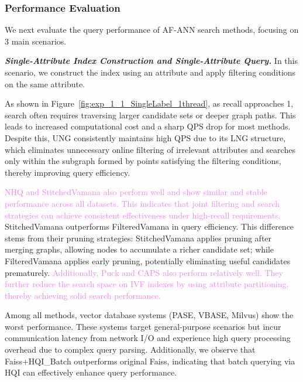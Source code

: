 \documentclass[sigconf, nonacm]{acmart}
\begin{document}
{	\subsubsection{Performance Evaluation}
	
	
	
	
	We next evaluate the query performance of AF-ANN search methods, focusing on 3 main scenarios.
	
	\textit{\textbf{Single-Attribute Index Construction and Single-Attribute Query.}}
	In this scenario, we construct the index using an attribute and apply filtering conditions on the same attribute.
	
	
	
	As shown in Figure~\ref{fig:exp_1_1_SingleLabel_1thread}, as recall approaches 1, search often requires traversing larger candidate sets or deeper graph paths. This leads to increased computational cost and a sharp QPS drop for most methods. Despite this, UNG consistently maintains high QPS due to its LNG structure, which eliminates unnecessary online filtering of irrelevant attributes and searches only within the subgraph formed by points satisfying the filtering conditions, thereby improving query efficiency.
	
	\textcolor{violet}{NHQ and StitchedVamana also perform well and show similar and stable performance across all datasets. This indicates that joint filtering and search strategies can achieve consistent effectiveness under high-recall requirements.} StitchedVamana outperforms FilteredVamana in query efficiency. This difference stems from their pruning strategies: StitchedVamana applies pruning after merging graphs, allowing nodes to accumulate a richer candidate set; while FilteredVamana applies early pruning, potentially eliminating useful candidates prematurely.
	\textcolor{violet}{Additionally, Puck and CAPS also perform relatively well. They further reduce the search space on IVF indexes by using attribute partitioning, thereby achieving solid search performance.}
	
	Among all methods, vector database systems (PASE, VBASE, Milvus) show the worst performance. These systems target general-purpose scenarios but incur communication latency from network I/O and experience high query processing overhead due to complex query parsing. Additionally, we observe that Faiss+HQI\_Batch outperforms original Faiss, indicating that batch querying via HQI can effectively enhance query performance.
	
}
\end{document}
